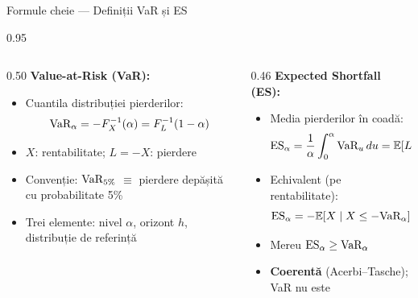 \documentclass[9pt, aspectratio=169, t]{beamer}
\begin{document}
\begin{frame}[shrink=10]{Formule cheie --- Definiții VaR și ES}
    \begin{cminipage}{0.95\textwidth}
    \begin{columns}[T]
        \begin{column}{0.50\textwidth}
            \textbf{Value-at-Risk (VaR):}
            \begin{itemize}\setlength{\itemsep}{0pt}
                \item Cuantila distribuției pierderilor:
                \[
                \text{VaR}_\alpha = -F_X^{-1}(\alpha) = F_L^{-1}(1-\alpha)
                \]
                \item $X$: rentabilitate; $L = -X$: pierdere
                \item Convenție: $\text{VaR}_{5\%}$ $\equiv$ pierdere depășită cu probabilitate 5\%
                \item Trei elemente: nivel $\alpha$, orizont $h$, distribuție de referință
            \end{itemize}
        \end{column}
        \begin{column}{0.46\textwidth}
            \textbf{Expected Shortfall (ES):}
            \begin{itemize}\setlength{\itemsep}{0pt}
                \item Media pierderilor în coadă:
                \[
                \text{ES}_\alpha = \frac{1}{\alpha}\int_0^\alpha \text{VaR}_u\, du = \mathbb{E}[L \mid L \geq \text{VaR}_\alpha]
                \]
                \item Echivalent (pe rentabilitate):
                \[
                \text{ES}_\alpha = -\mathbb{E}[X \mid X \leq -\text{VaR}_\alpha]
                \]
                \item Mereu $\text{ES}_\alpha \geq \text{VaR}_\alpha$
                \item \textbf{Coerentă} (Acerbi--Tasche); VaR nu este
            \end{itemize}
        \end{column}
    \end{columns}
    \end{cminipage}
\end{frame}
\end{document}
